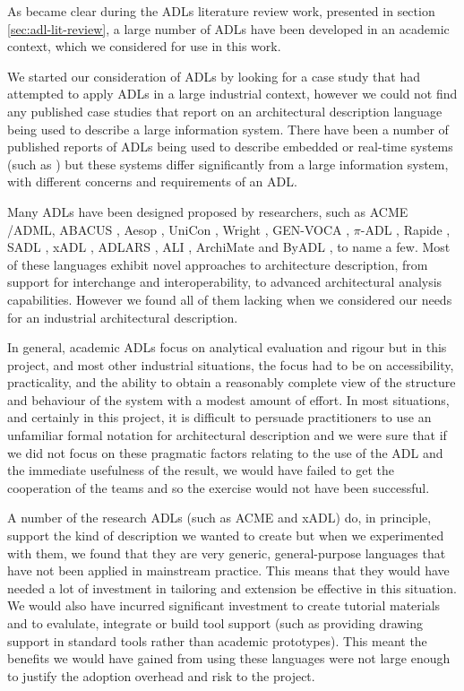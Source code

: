   As became clear during the ADLs literature review work, presented in section \ref{sec:adl-lit-review}, a large number of ADLs have been developed in an academic context, which we considered for use in this work.

  We started our consideration of ADLs by looking for a case study that had attempted to apply ADLs in a large industrial context, however we could not find any published case studies that report on an architectural description language being used to describe a large information system. There have been a number of published reports of ADLs being used to describe embedded or real-time systems (such as \cite{feiler2000-realtime, lonn2004-east, cuenot2010-east, vanommering2000-koala, sae2009-aadl}) but these systems differ significantly from a large information system, with different concerns and requirements of an ADL.

  Many ADLs have been designed proposed by researchers, such as ACME \cite{garlan1997-acme}/ADML, 
  ABACUS \cite{dunsire2005-abacus}, Aesop \cite{garlan1994-aesop}, 
  UniCon \cite{shaw1996-unicon}, Wright \cite{allen1996-wright}, GEN-VOCA \cite{batory1997-genvoca}, $\pi$-ADL \cite{oquendo2004-piadl}, Rapide \cite{luckham1995-rapideexample}, SADL \cite{moriconi1997-sadl}, 
  xADL \cite{khare2001-xadl}, ADLARS \cite{bashroush2005-adlars}, ALI \cite{bashroush2008-ali}, 
  ArchiMate \cite{lankhorst2009-archimate} and ByADL \cite{diruscio2010-byadl}, to name a few. Most of these languages exhibit novel approaches to architecture description, from support for interchange and interoperability, to advanced architectural analysis capabilities.  However we found all of them lacking when we considered our needs for an industrial architectural description.

  In general, academic ADLs focus on analytical evaluation and rigour but in this project, and most other industrial situations, the focus had to be on accessibility, practicality, and the ability to obtain a reasonably complete view of the structure and behaviour of the system with a modest amount of effort. In most situations, and certainly in this project, it is difficult to persuade practitioners to use an unfamiliar formal notation for architectural description and we were sure that if we did not focus on these pragmatic factors relating to the use of the ADL and the immediate usefulness of the result, we would have failed to get the cooperation of the teams and so the exercise would not have been successful.

  A number of the research ADLs (such as ACME and xADL) do, in principle, support the kind of description we wanted to create but when we experimented with them, we found that they are very generic, general-purpose languages that have not been applied in mainstream practice. This means that they would have needed a lot of investment in tailoring and extension be effective in this situation.  We would also have incurred significant investment to create tutorial materials and to evalulate, integrate or build tool support (such as providing drawing support in standard tools rather than academic prototypes). This meant the benefits we would have gained from using these languages were not large enough to justify the adoption overhead and risk to the project.

